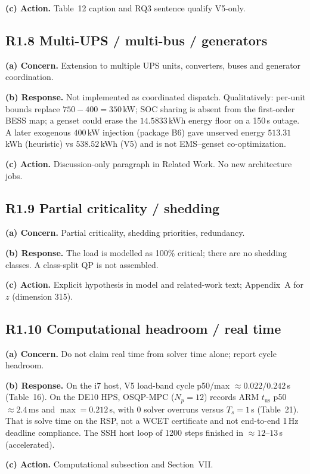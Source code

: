 \documentclass[11pt]{article}
\begin{document}
\textbf{(c) Action.} Table~12 caption and RQ3 sentence qualify V5-only.

\subsection*{R1.8 Multi-UPS / multi-bus / generators}
\textbf{(a) Concern.} Extension to multiple UPS units, converters, buses and generator coordination.

\textbf{(b) Response.} Not implemented as coordinated dispatch. Qualitatively: per-unit bounds replace $750-400=350$\,kW; SOC sharing is absent from the first-order BESS map; a genset could erase the $14.5833$\,kWh energy floor on a 150\,s outage. A later exogenous $400$\,kW injection (package B6) gave unserved energy $513.31$\,kWh (heuristic) vs $538.52$\,kWh (V5) and is not EMS--genset co-optimization.

\textbf{(c) Action.} Discussion-only paragraph in Related Work. No new architecture jobs.

\subsection*{R1.9 Partial criticality / shedding}
\textbf{(a) Concern.} Partial criticality, shedding priorities, redundancy.

\textbf{(b) Response.} The load is modelled as 100\% critical; there are no shedding classes. A class-split QP is not assembled.

\textbf{(c) Action.} Explicit hypothesis in model and related-work text; Appendix~A for $z$ (dimension 315).

\subsection*{R1.10 Computational headroom / real time}
\textbf{(a) Concern.} Do not claim real time from solver time alone; report cycle headroom.

\textbf{(b) Response.} On the i7 host, V5 load-band cycle p50/max $\approx 0.022/0.242$\,s (Table~16). On the DE10 HPS, OSQP-MPC ($N_p=12$) records ARM $t_{\mathrm{us}}$ p50 $\approx 2.4$\,ms and $\max=0.212$\,s, with 0 solver overruns versus $T_s=1$\,s (Table~21). That is solve time on the RSP, not a WCET certificate and not end-to-end 1\,Hz deadline compliance. The SSH host loop of 1200 steps finished in $\approx 12$--$13$\,s (accelerated).

\textbf{(c) Action.} Computational subsection and Section~VII.
\end{document}
